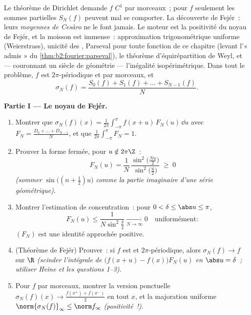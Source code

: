 \begin{problem}\label{pb:b2:fourier:1}
Le théorème de Dirichlet demande $f$ $C^1$ par morceaux~; pour $f$
seulement  les sommes partielles $S_N(f)$ peuvent mal se
comporter. La découverte de Fejér~: leurs \emph{moyennes de Cesàro}
ne le font jamais. Le moteur est la positivité du noyau de Fejér, et
la moisson est immense~: approximation trigonométrique uniforme
(Weierstrass), unicité des , Parseval pour
toute fonction de ce chapitre (levant l'« admis » du
\cref{thm:b2:fourier:parseval}), le théorème d'équirépartition de
Weyl, et --- couronnant un siècle de géométrie --- l'inégalité
isopérimétrique.
Dans tout le problème, $f$ est $2\pi$-périodique et  par
morceaux, et
\[
\sigma_N(f) = \frac{S_0(f) + S_1(f) + \dots +
S_{N-1}(f)}{N} .
\]

\medskip
\noindent\textbf{Partie I --- Le noyau de Fejér.}
\begin{enumerate}
  \item Montrer que $\sigma_N(f)(x) =
        \frac{1}{2\pi}\int_{-\pi}^{\pi}f(x+u)\,F_N(u)\,\dd u$
        avec $F_N = \frac{D_0 + \dots + D_{N-1}}{N}$, et que
        $\frac{1}{2\pi}\int_{-\pi}^{\pi}F_N = 1$.
  \item Prouver la forme fermée, pour $u \notin 2\pi\Z$~:
        \[
        F_N(u) = \frac{1}{N}\,
        \frac{\sin^2\bigl(\frac{Nu}{2}\bigr)}
        {\sin^2\bigl(\frac u2\bigr)} \;\geq\; 0
        \]
        \emph{(sommer $\sin\bigl((n+\frac12)u\bigr)$ comme la
        partie imaginaire d'une série géométrique)}.
  \item Montrer l'estimation de concentration~: pour $0 < \delta
        \leq \abs u \leq \pi$,
        \[
        F_N(u) \leq \frac{1}{N\sin^2\frac\delta2}
        \xrightarrow[N\to\infty]{} 0
        \quad\text{uniformément} :
        \]
        $(F_N)$ est une identité approchée positive.
  \item (Théorème de Fejér) Prouver~: si $f$ est  et
        $2\pi$-périodique, alors $\sigma_N(f) \to f$
        \emph{} sur $\R$ \emph{(scinder l'intégrale de
        $\bigl(f(x+u) - f(x)\bigr)F_N(u)$ en $\abs u =
        \delta$~; utiliser Heine et les questions 1--3)}.
  \item Pour $f$  par morceaux, montrer la version
        ponctuelle $\sigma_N(f)(x) \to \frac{f(x^+) +
        f(x^-)}{2}$ en tout $x$, et la majoration uniforme
        $\norm{\sigma_N(f)}_\infty \leq \norm f_\infty$
        \emph{(positivité~!)}.
\end{enumerate}


\end{problem}
